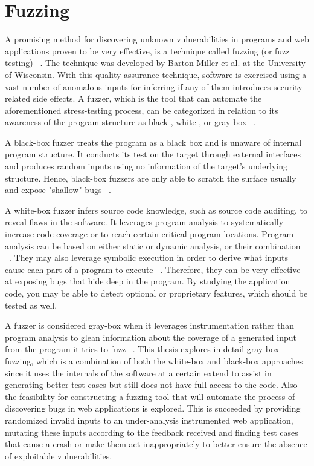 \section{Fuzzing}
A promising method for discovering unknown vulnerabilities in
programs and web applications proven to be very effective, is a technique called fuzzing (or fuzz testing) ~\cite{fuzzing_def}. The technique was developed by Barton Miller et al. at the University of Wisconsin.
With this quality assurance technique, software is exercised using a vast number of anomalous inputs for inferring if any of them introduces security-related side effects. A fuzzer, which is the tool that can automate the aforementioned stress-testing process, can be categorized in relation to its awareness of the program structure as black-, white-, or gray-box ~\cite{fuzzing_book}. 

A black-box fuzzer treats the program as a black box and is unaware of
internal program structure. It conducts its test on the target through external
interfaces and produces random inputs using no information of the target's underlying structure. Hence,  black-box fuzzers are only able to scratch the surface usually and expose "shallow" bugs ~\cite{fuzzing_owasp}. 

A white-box fuzzer infers source code knowledge, such as source code auditing, to reveal
flaws in the software. It leverages program analysis to systematically
increase code coverage or to reach certain critical program locations. Program analysis can be based on either static or dynamic analysis, or their combination ~\cite{program_analysis_book}. They may also leverage symbolic execution in order to derive what inputs cause each part of a program to execute ~\cite{symbolic_exe}. Therefore, they can be very effective at exposing bugs that hide deep in the program. By studying the application code, you may be able to detect optional or proprietary features, which should be tested as well.

A fuzzer is considered gray-box when it leverages instrumentation rather than program analysis to glean information about the coverage of a generated input from the program it tries to fuzz ~\cite{zalewski2015american,efs2007}. This thesis explores in detail gray-box fuzzing, which is a combination of both the white-box and black-box approaches since it uses the internals of the software at a certain extend to assist in generating better test cases but still does not have full access to the code. Also the feasibility for constructing a fuzzing tool that will automate the process of discovering bugs in web applications is explored. This is succeeded by providing randomized invalid inputs to an under-analysis instrumented web application, mutating these inputs according to the feedback received and finding test cases that cause a crash or make them act inappropriately to better ensure the absence of exploitable vulnerabilities.

